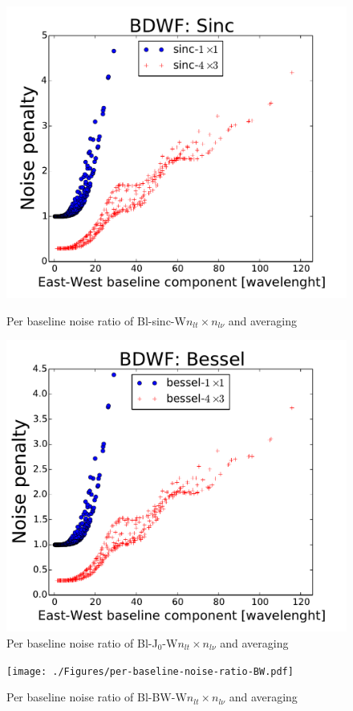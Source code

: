 \documentclass[useAMS,usenatbib]{mn2e}
\begin{document}
\begin{figure}
    \begin{minipage}{0.38\linewidth}\includegraphics[width=1\textwidth]{./Figures/per-baseline-noise-ratio-sinc.pdf}
  \caption{Per baseline noise ratio of Bl-sinc-W$n_{lt}\times n_{l\nu}$ and averaging}\label{fig:per-baseline-noise-ratio-sinc}
  \end{minipage}
  \hspace{1cm}
  \begin{minipage}{0.38\linewidth}\includegraphics[width=1\textwidth]{./Figures/per-baseline-noise-ratio-bessel.pdf}\\
  \caption{Per baseline noise ratio of Bl-J$_0$-W$n_{lt}\times n_{l\nu}$ and 
averaging}\label{fig:per-baseline-noise-ratio-bessel}\end{minipage}
  \begin{minipage}{0.38\linewidth}\texttt{[image: ./Figures/per-baseline-noise-ratio-BW.pdf]}
  \caption{Per baseline noise ratio of Bl-BW-W$n_{lt}\times n_{l\nu}$ and averaging}\label{fig:per-baseline-noise-ratio-BW}
  \end{minipage}
\end{figure}
\end{document}
